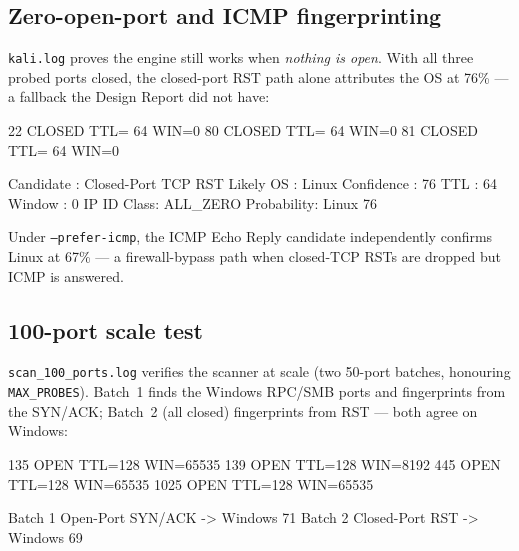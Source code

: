 \subsection{Zero-open-port and ICMP fingerprinting}\label{sub:closed}
\texttt{kali.log} proves the engine still works when \emph{nothing is open}. With all three
probed ports closed, the closed-port RST path alone attributes the OS at 76\% — a fallback
the Design Report did not have:
\begin{logbox}
   22  CLOSED   TTL= 64 WIN=0     80  CLOSED   TTL= 64 WIN=0     81  CLOSED   TTL= 64 WIN=0

  Candidate  : Closed-Port TCP RST      Likely OS : Linux      Confidence : 76%
  TTL : 64      Window : 0      IP ID Class: ALL_ZERO
  Probability:  Linux 76%
\end{logbox}

Under \texttt{--prefer-icmp}, the ICMP Echo Reply candidate independently confirms Linux at
67\% — a firewall-bypass path when closed-TCP RSTs are dropped but ICMP is answered.

\subsection{100-port scale test}\label{sub:scale}
\texttt{scan\_100\_ports.log} verifies the scanner at scale (two 50-port batches, honouring
\texttt{MAX\_PROBES}). Batch~1 finds the Windows RPC/SMB ports and fingerprints from the
SYN/ACK; Batch~2 (all closed) fingerprints from RST — both agree on Windows:
\begin{logbox}
   135 OPEN TTL=128 WIN=65535   139 OPEN TTL=128 WIN=8192
   445 OPEN TTL=128 WIN=65535   1025 OPEN TTL=128 WIN=65535

  Batch 1  Open-Port SYN/ACK  -> Windows 71%
  Batch 2  Closed-Port RST     -> Windows 69%
\end{logbox}

